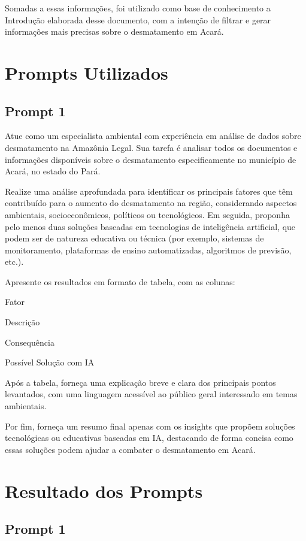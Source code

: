 \documentclass[12pt, a4paper, onecolumn, notitlepage]{article}
\begin{document}
    Somadas a essas informações, foi utilizado como base de conhecimento a Introdução elaborada desse documento, com a intenção de filtrar e gerar informações mais precisas sobre o desmatamento em Acará.

    \section{Prompts Utilizados}
    \subsection{Prompt 1}
    Atue como um especialista ambiental com experiência em análise de dados sobre desmatamento na Amazônia Legal. Sua tarefa é analisar todos os documentos e informações disponíveis sobre o desmatamento especificamente no município de Acará, no estado do Pará.

    Realize uma análise aprofundada para identificar os principais fatores que têm contribuído para o aumento do desmatamento na região, considerando aspectos ambientais, socioeconômicos, políticos ou tecnológicos. Em seguida, proponha pelo menos duas soluções baseadas em tecnologias de inteligência artificial, que podem ser de natureza educativa ou técnica (por exemplo, sistemas de monitoramento, plataformas de ensino automatizadas, algoritmos de previsão, etc.).

    Apresente os resultados em formato de tabela, com as colunas:

    Fator

    Descrição

    Consequência

    Possível Solução com IA

    Após a tabela, forneça uma explicação breve e clara dos principais pontos levantados, com uma linguagem acessível ao público geral interessado em temas ambientais.

    Por fim, forneça um resumo final apenas com os insights que propõem soluções tecnológicas ou educativas baseadas em IA, destacando de forma concisa como essas soluções podem ajudar a combater o desmatamento em Acará.

    \section{Resultado dos Prompts}
    \subsection{Prompt 1}
\end{document}
